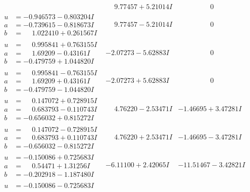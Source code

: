 \documentclass[1p]{elsarticle_modified}
\theoremstyle{definition}
\begin{document}
$$\begin{array}{c|c|c}
 & \phantom{-}9.77457 + 5.21014 I & \phantom{-0.000000 } 0 \\ \hline\begin{aligned}
u &= -0.946573 - 0.803204 I \\
a &= -0.739615 - 0.818673 I \\
b &= \phantom{-}1.022410 + 0.261567 I\end{aligned}
 & \phantom{-}9.77457 - 5.21014 I & \phantom{-0.000000 } 0 \\ \hline\begin{aligned}
u &= \phantom{-}0.995841 + 0.763155 I \\
a &= \phantom{-}1.69209 - 0.43161 I \\
b &= -0.479759 + 1.044820 I\end{aligned}
 & -2.07273 - 5.62883 I & \phantom{-0.000000 } 0 \\ \hline\begin{aligned}
u &= \phantom{-}0.995841 - 0.763155 I \\
a &= \phantom{-}1.69209 + 0.43161 I \\
b &= -0.479759 - 1.044820 I\end{aligned}
 & -2.07273 + 5.62883 I & \phantom{-0.000000 } 0 \\ \hline\begin{aligned}
u &= \phantom{-}0.147072 + 0.728915 I \\
a &= \phantom{-}0.683793 - 0.110743 I \\
b &= -0.656032 + 0.815272 I\end{aligned}
 & \phantom{-}4.76220 - 2.53471 I & -1.46695 + 3.47281 I \\ \hline\begin{aligned}
u &= \phantom{-}0.147072 - 0.728915 I \\
a &= \phantom{-}0.683793 + 0.110743 I \\
b &= -0.656032 - 0.815272 I\end{aligned}
 & \phantom{-}4.76220 + 2.53471 I & -1.46695 - 3.47281 I \\ \hline\begin{aligned}
u &= -0.150086 + 0.725683 I \\
a &= \phantom{-}0.54471 + 1.31256 I \\
b &= -0.202918 - 1.187480 I\end{aligned}
 & -6.11100 + 2.42065 I & -11.51467 - 3.42821 I \\ \hline\begin{aligned}
u &= -0.150086 - 0.725683 I \\

\end{aligned}
\end{array}$$
\end{document}
